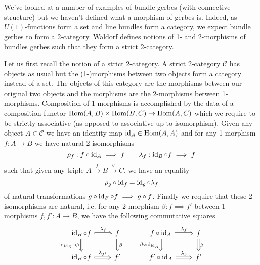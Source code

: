 \documentclass{amsart}
\begin{document}
We've looked at a number of examples of bundle gerbes (with connective structure) but
we haven't defined what a morphism of gerbes is. Indeed, as $U(1)$-functions
form a set and line bundles form a category, we expect bundle gerbes to form a
2-category. Waldorf defines notions of 1- and 2-morphisms of bundles gerbes 
such that they form a strict 2-category.

Let us first recall the
notion of a strict 2-category. A strict 2-category $\mathcal{C}$ has objects as usual but the
(1-)morphisms between two objects form a category instead of a set. The objects
of this category are the morphisms between our original two objects and the morphisms
are the 2-morphisms between 1-morphisms. Composition of 1-morphisms is accomplished
by the data of a composition functor $\operatorname{Hom}(A,B)\times\operatorname{Hom}(B,C)\to \operatorname{Hom}(A,C)$ which
we require to be strictly associative (as opposed to associative up to isomorphism).
Given any object $A\in\mathcal{C}$ we have an identity map $\operatorname{id}_A\in\operatorname{Hom}(A,A)$ and
for any 1-morphism $f:A\to B$ we have natural 2-isomorphisms
\begin{equation*}
    \rho_f: f \circ \operatorname{id}_A \implies f \qquad \lambda_f: \operatorname{id}_B\circ f\implies f
\end{equation*}
such that given any triple $A\xrightarrow{f} B\xrightarrow{g} C$, we have an equality
\begin{equation*}
    \rho_g \circ \operatorname{id}_f = \operatorname{id}_g\circ\lambda_f
\end{equation*}
of natural transformations $g\circ \operatorname{id}_B\circ f \implies g \circ f$.
Finally we require that these 2-isomorphisms are natural, i.e. for any 2-morphism
$\beta:f\implies f'$ between 1-morphisms $f,f':A\to B$, we have the following
commutative squares
\begin{equation*}
    \begin{tikzcd}
        \id_B\circ f \ar[r, Rightarrow, "\lambda_f"]\ar[d, Rightarrow, swap, "\id_{\id_B}\circ\beta"] & f \ar[d, Rightarrow, "\beta"] \\
        \id_B\circ f \ar[r, Rightarrow, "\lambda_{f'}"] & f'
    \end{tikzcd}
    \qquad
    \begin{tikzcd}
        f\circ\id_A \ar[r, Rightarrow, "\lambda_f"] \ar[d, Rightarrow, swap, "\beta\circ\id_{\id_A}"] & f \ar[d, Rightarrow, "\beta"] \\
        f'\circ \id_A \ar[r, Rightarrow, "\lambda_g"] & f'
    \end{tikzcd}
\end{equation*}
\end{document}
